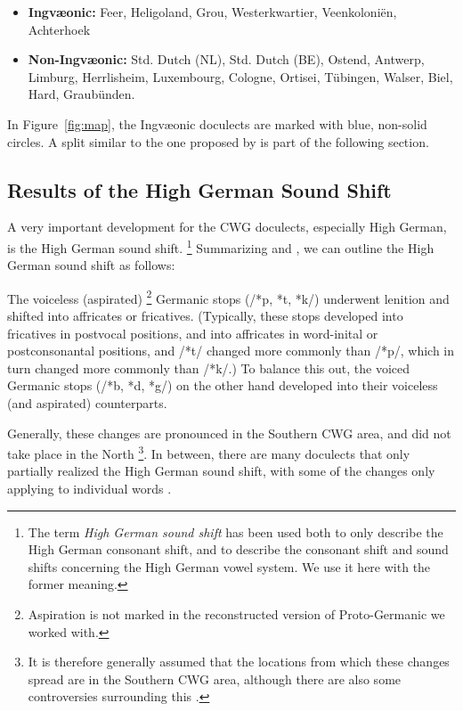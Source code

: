 \documentclass[a4paper]{article}
\begin{document}
\begin{itemize}
\item 
\textbf{Ingv\ae{}onic:}
Feer, Heligoland, Grou,
Westerkwartier, Veenkoloni\"{e}n, Achterhoek

\item
\textbf{Non-Ingv\ae{}onic:}
Std. Dutch (NL), Std. Dutch (BE), Ostend, Antwerp, Limburg,
Herrlisheim, Luxembourg, Cologne,
Ortisei, T\"{u}bingen, Walser, Biel, Hard, Graub\"{u}nden.
\end{itemize}

In Figure~\ref{fig:map}, the Ingv\ae{}onic doculects
are marked with blue, non-solid circles.
A split similar to the one proposed by \citet{sonderegger1979grundzuege}
is part of the following section.

\subsection{Results of the High German Sound Shift}

A very important development for the CWG doculects,
especially High German, is the High German sound shift.
\footnote{
The term \textit{High German sound shift} has been used both
to only describe the High German consonant shift,
and to describe the consonant shift and sound shifts concerning
the High German vowel system.
We use it here with the former meaning.
}
Summarizing \citet[pp. 47--48]{harbert2007germanic}
and \citet[pp. 62--64]{koenig2015dtv},
we can outline the High German sound shift as follows:

The voiceless (aspirated)
\footnote{
Aspiration is not marked in the reconstructed version of Proto-Germanic
we worked with.
}
Germanic stops (/*p, *t, *k/)
underwent lenition and shifted into affricates or fricatives.
(Typically, these stops developed into fricatives in postvocal positions,
and into affricates in word-inital or postconsonantal positions,
and /*t/ changed more commonly than /*p/,
which in turn changed more commonly than /*k/.)
To balance this out,
the voiced Germanic stops (/*b, *d, *g/) on the other hand
developed into their voiceless (and aspirated) counterparts.

Generally, these changes are pronounced
in the Southern CWG area, and did not take place in the North
\cite[p. 33]{noble1983modern}
\footnote{
It is therefore generally assumed that the locations
from which these changes spread are in the Southern CWG area,
although there are also some controversies surrounding this
\citep[pp. 155--181]{goblirsch2005lautverschiebungen}.
}.
In between, there are many doculects
that only partially realized the High German sound shift,
with some of the changes only applying to individual words
\citet[p. 63]{koenig2015dtv}.
\end{document}
